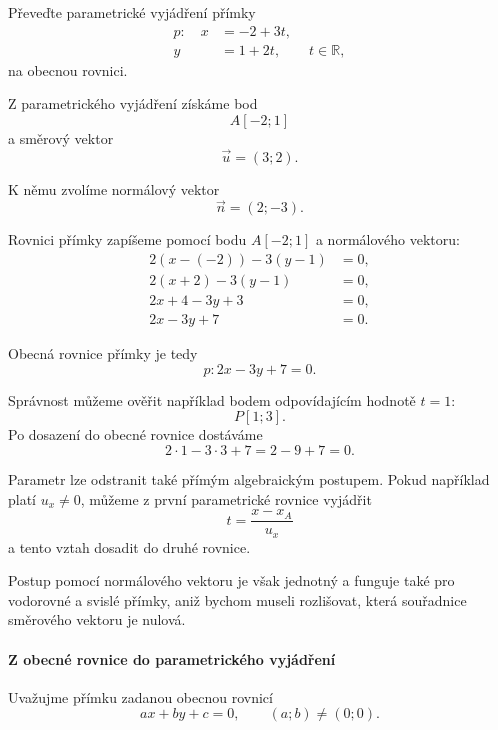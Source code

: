 \begin{example}\label{exa:Conversion_parametric_to_general}
    Převeďte parametrické vyjádření přímky
    \[
        \begin{aligned}
            p:\quad x&=-2+3t,\\
                     y&=1+2t,
                     \qquad t\in\mathbb{R},
        \end{aligned}
    \]
    na obecnou rovnici.

    Z parametrického vyjádření získáme bod
    \[
        A[-2;1]
    \]
    a směrový vektor
    \[
        \vec{u}=(3;2).
    \]

    K němu zvolíme normálový vektor
    \[
        \vec{n}=(2;-3).
    \]

    Rovnici přímky zapíšeme pomocí bodu $A[-2;1]$ a normálového
    vektoru:
    \begin{align*}
        2(x-(-2))-3(y-1)&=0,\\
        2(x+2)-3(y-1)&=0,\\
        2x+4-3y+3&=0,\\
        2x-3y+7&=0.
    \end{align*}

    Obecná rovnice přímky je tedy
    \[
        p:2x-3y+7=0.
    \]

    Správnost můžeme ověřit například bodem odpovídajícím hodnotě
    $t=1$:
    \[
        P[1;3].
    \]
    Po dosazení do obecné rovnice dostáváme
    \[
        2\cdot1-3\cdot3+7=2-9+7=0.
    \]
\end{example}

\begin{remark}\label{rem:Eliminating_parameter_line_conversion}
    Parametr lze odstranit také přímým algebraickým postupem. Pokud
    například platí $u_x\neq0$, můžeme z první parametrické rovnice
    vyjádřit
    \[
        t=\frac{x-x_A}{u_x}
    \]
    a tento vztah dosadit do druhé rovnice.

    Postup pomocí normálového vektoru je však jednotný a funguje také
    pro vodorovné a svislé přímky, aniž bychom museli rozlišovat, která
    souřadnice směrového vektoru je nulová.
\end{remark}


\paragraph{Z obecné rovnice do parametrického vyjádření}

Uvažujme přímku zadanou obecnou rovnicí
\begin{equation}\label{eq:Conversion_general_form}
    ax+by+c=0,
    \qquad
    (a;b)\neq(0;0).
\end{equation}

